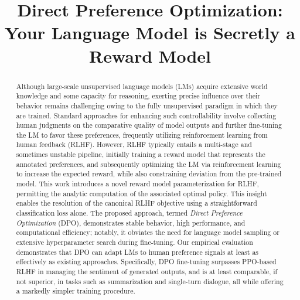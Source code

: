 \title{Direct Preference Optimization: Your Language Model is Secretly a Reward Model}

\begin{abstract}
Although large-scale unsupervised language models (LMs) acquire extensive world knowledge and some capacity for reasoning, exerting precise influence over their behavior remains challenging owing to the fully unsupervised paradigm in which they are trained. Standard approaches for enhancing such controllability involve collecting human judgments on the comparative quality of model outputs and further fine-tuning the LM to favor these preferences, frequently utilizing reinforcement learning from human feedback (RLHF). However, RLHF typically entails a multi-stage and sometimes unstable pipeline, initially training a reward model that represents the annotated preferences, and subsequently optimizing the LM via reinforcement learning to increase the expected reward, while also constraining deviation from the pre-trained model. This work introduces a novel reward model parameterization for RLHF, permitting the analytic computation of the associated optimal policy. This insight enables the resolution of the canonical RLHF objective using a straightforward classification loss alone. The proposed approach, termed \textit{Direct Preference Optimization} (DPO), demonstrates stable behavior, high performance, and computational efficiency; notably, it obviates the need for language model sampling or extensive hyperparameter search during fine-tuning. Our empirical evaluation demonstrates that DPO can adapt LMs to human preference signals at least as effectively as existing approaches. Specifically, DPO fine-tuning surpasses PPO-based RLHF in managing the sentiment of generated outputs, and is at least comparable, if not superior, in tasks such as summarization and single-turn dialogue, all while offering a markedly simpler training procedure.
\end{abstract}

